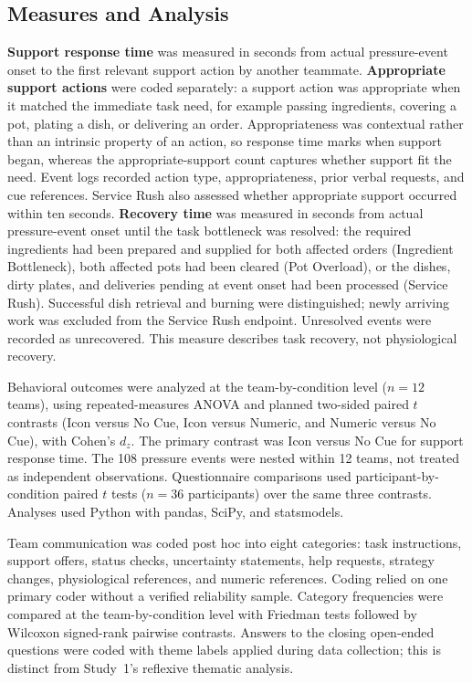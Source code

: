 \documentclass[sigconf]{acmart}
\begin{document}
\subsection{Measures and Analysis}
\textbf{Support response time} was measured in seconds from actual pressure-event onset to the first relevant support action by another teammate. \textbf{Appropriate support actions} were coded separately: a support action was appropriate when it matched the immediate task need, for example passing ingredients, covering a pot, plating a dish, or delivering an order. Appropriateness was contextual rather than an intrinsic property of an action, so response time marks when support began, whereas the appropriate-support count captures whether support fit the need. Event logs recorded action type, appropriateness, prior verbal requests, and cue references. Service Rush also assessed whether appropriate support occurred within ten seconds. \textbf{Recovery time} was measured in seconds from actual pressure-event onset until the task bottleneck was resolved: the required ingredients had been prepared and supplied for both affected orders (Ingredient Bottleneck), both affected pots had been cleared (Pot Overload), or the dishes, dirty plates, and deliveries pending at event onset had been processed (Service Rush). Successful dish retrieval and burning were distinguished; newly arriving work was excluded from the Service Rush endpoint. Unresolved events were recorded as unrecovered. This measure describes task recovery, not physiological recovery.

Behavioral outcomes were analyzed at the team-by-condition level ($n=12$ teams), using repeated-measures ANOVA and planned two-sided paired $t$ contrasts (Icon versus No Cue, Icon versus Numeric, and Numeric versus No Cue), with Cohen's $d_z$. The primary contrast was Icon versus No Cue for support response time. The 108 pressure events were nested within 12 teams, not treated as independent observations. Questionnaire comparisons used participant-by-condition paired $t$ tests ($n=36$ participants) over the same three contrasts. Analyses used Python with pandas, SciPy, and statsmodels.

Team communication was coded post hoc into eight categories: task instructions, support offers, status checks, uncertainty statements, help requests, strategy changes, physiological references, and numeric references. Coding relied on one primary coder without a verified reliability sample. Category frequencies were compared at the team-by-condition level with Friedman tests followed by Wilcoxon signed-rank pairwise contrasts. Answers to the closing open-ended questions were coded with theme labels applied during data collection; this is distinct from Study~1's reflexive thematic analysis.
\end{document}
